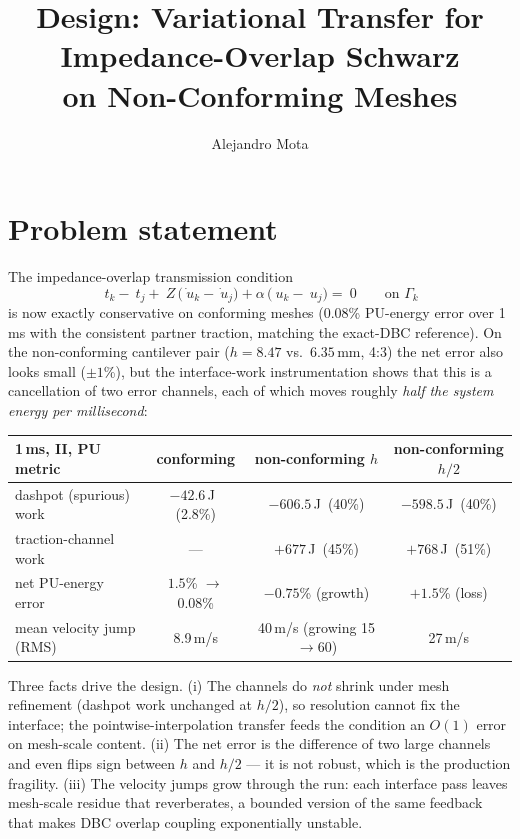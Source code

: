 \documentclass[11pt]{article}
\title{Design: Variational Transfer for Impedance-Overlap Schwarz \\
on Non-Conforming Meshes}
\author{Alejandro Mota}
\begin{document}
\maketitle

\section{Problem statement}

The impedance-overlap transmission condition
\begin{equation}
  ~t_k - ~t_j
  + ~Z\,\bigl(\dot{~u}_k - \dot{~u}_j\bigr)
  + \alpha\,\bigl(~u_k - ~u_j\bigr) = ~0
  \qquad \text{on } \Gamma_k
  \label{eq:tc}
\end{equation}
is now exactly conservative on conforming meshes (0.08\% PU-energy error
over 1\,ms with the consistent partner traction, matching the
exact-DBC reference).  On the non-conforming cantilever pair
($h = 8.47$ vs.\ $6.35$\,mm, 4:3) the net error also looks small
($\pm 1$\%), but the interface-work instrumentation shows that this is
a cancellation of two error channels, each of which moves roughly
\emph{half the system energy per millisecond}:

\begin{center}
\small
\begin{tabular}{lccc}
\toprule
1\,ms, II, PU metric & conforming & non-conforming $h$ & non-conforming $h/2$ \\
\midrule
dashpot (spurious) work & $-42.6$\,J \,(2.8\%) & $-606.5$\,J \,(40\%) & $-598.5$\,J \,(40\%) \\
traction-channel work & --- & $+677$\,J \,(45\%) & $+768$\,J \,(51\%) \\
net PU-energy error & $1.5$\% $\to$ 0.08\% & $-0.75$\% (growth) & $+1.5$\% (loss) \\
mean velocity jump (RMS) & 8.9\,m/s & 40\,m/s (growing 15$\to$60) & 27\,m/s \\
\bottomrule
\end{tabular}
\end{center}

Three facts drive the design.  (i) The channels do \emph{not} shrink
under mesh refinement (dashpot work unchanged at $h/2$), so resolution
cannot fix the interface; the pointwise-interpolation transfer feeds
the condition an $O(1)$ error on mesh-scale content.  (ii) The net
error is the difference of two large channels and even flips sign
between $h$ and $h/2$ --- it is not robust, which is the production
fragility.  (iii) The velocity jumps grow through the run: each
interface pass leaves mesh-scale residue that reverberates, a bounded
version of the same feedback that makes DBC overlap coupling
exponentially unstable.
\end{document}
